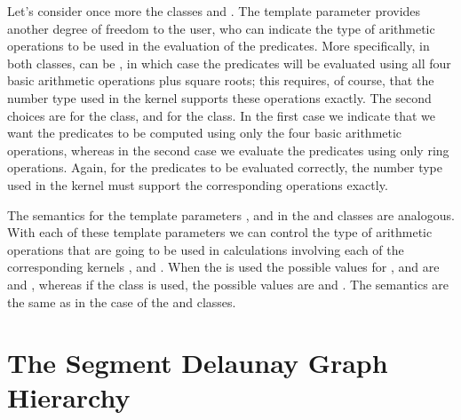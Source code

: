 Let's consider once more the classes
 and 
.
The template parameter  provides another degree of freedom
to the user, who can indicate the type of arithmetic operations to
be used in the evaluation of the predicates. More specifically, in
both classes,  can be , in
which case the predicates will be evaluated using all four basic
arithmetic operations plus square roots; this requires, of course,
that the number type used in the kernel  supports these
operations exactly. The second choices are  for
the  class, and
 for the
class. In the first case we indicate that we want the predicates to be
computed using only the four basic arithmetic operations, whereas in
the second case we evaluate the predicates using only ring operations.
Again, for the predicates to be evaluated correctly, the number type
used in the kernel  must support the corresponding operations
exactly.

The semantics for the template parameters ,  and
 in the
 and 
classes are analogous. With each of these template parameters we can
control the type of arithmetic operations that are going to be used in
calculations involving each of the corresponding kernels ,
 and . When the
 is
used the possible values for ,  and  are
 and , whereas if the 
class is used, the possible values are  and
. The semantics are the same as in the case of the 
 and 
 classes.






\section{The Segment Delaunay Graph Hierarchy}
\label{sec:sdg2-hierarchy}


